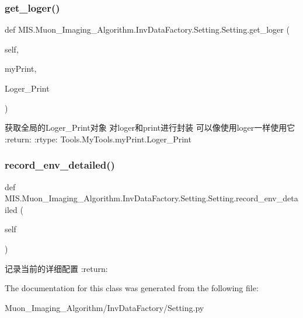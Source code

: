 \subsubsection{\texorpdfstring{get\+\_\+loger()}{get\_loger()}}
{\footnotesize\ttfamily def M\+I\+S.\+Muon\+\_\+\+Imaging\+\_\+\+Algorithm.\+Inv\+Data\+Factory.\+Setting.\+Setting.\+get\+\_\+loger (\begin{DoxyParamCaption}\item[{}]{self,  }\item[{}]{my\+Print,  }\item[{}]{Loger\+\_\+\+Print }\end{DoxyParamCaption})}

\begin{DoxyVerb}获取全局的Loger_Print对象
对loger和print进行封装
可以像使用loger一样使用它
:return:
:rtype: Tools.MyTools.myPrint.Loger_Print
\end{DoxyVerb}
 \mbox{\label{classMIS_1_1Muon__Imaging__Algorithm_1_1InvDataFactory_1_1Setting_1_1Setting_aabaadb79b4753997764a2418b4bac402}} 
\subsubsection{\texorpdfstring{record\+\_\+env\+\_\+detailed()}{record\_env\_detailed()}}
{\footnotesize\ttfamily def M\+I\+S.\+Muon\+\_\+\+Imaging\+\_\+\+Algorithm.\+Inv\+Data\+Factory.\+Setting.\+Setting.\+record\+\_\+env\+\_\+detailed (\begin{DoxyParamCaption}\item[{}]{self }\end{DoxyParamCaption})}

\begin{DoxyVerb}记录当前的详细配置
:return:
\end{DoxyVerb}
 

The documentation for this class was generated from the following file\+:\begin{DoxyCompactItemize}
\item 
Muon\+\_\+\+Imaging\+\_\+\+Algorithm/\+Inv\+Data\+Factory/Setting.\+py\end{DoxyCompactItemize}
